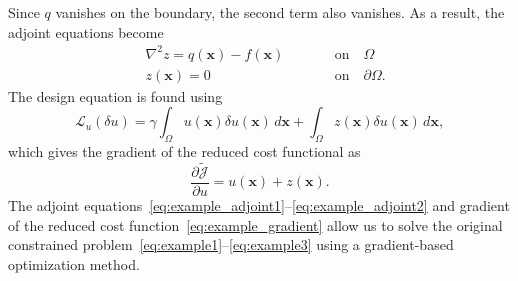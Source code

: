 Since $q$ vanishes on the boundary, the second term also vanishes. As a result, the adjoint equations become
\begin{align}
\label{eq:example_adjoint1}
&\nabla^2 z = q(\mathbf{x}) - f(\mathbf{x}) & \qquad & \text{on} \quad \Omega \\
\label{eq:example_adjoint2}
&z(\mathbf{x}) = 0 & \qquad & \text{on} \quad \partial \Omega.
\end{align}
The design equation is found using
\begin{equation}
\mathcal{L}_u(\delta u) = \gamma \int_\Omega u(\mathbf{x}) \delta u(\mathbf{x}) \, d\mathbf{x} + \int_\Omega z(\mathbf{x}) \delta u(\mathbf{x}) \, d\mathbf{x},
\end{equation}
which gives the gradient of the reduced cost functional as 
\begin{equation}
\label{eq:example_gradient}
\frac{\partial \tilde{\mathcal{J}}}{\partial u} = u(\mathbf{x}) + z(\mathbf{x}).
\end{equation}
The adjoint equations~\eqref{eq:example_adjoint1}--\eqref{eq:example_adjoint2} and gradient of the reduced cost function~\eqref{eq:example_gradient} allow us to solve the original constrained problem~\eqref{eq:example1}--\eqref{eq:example3} using a gradient-based optimization method.